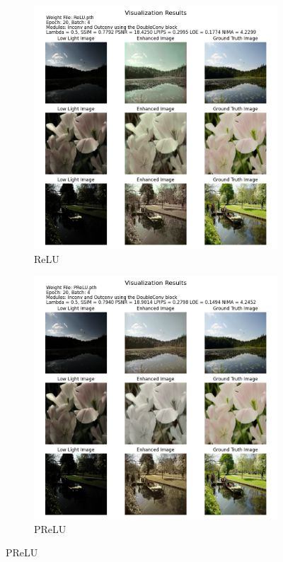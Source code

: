 \documentclass[a4paper]{ctexart}
\begin{document}
	\begin{figure}[htbp]
		\centering
		\begin{subfigure}{0.45\textwidth}
			\includegraphics[width=\linewidth]{picture/LLIE/Experiment/myplot_UNet_ReLU}
			\captionsetup{font=scriptsize}
			\caption{ReLU}
			\label{fig: Baseline_ReLU}	
		\end{subfigure}
		\begin{subfigure}{0.45\textwidth}
			\includegraphics[width=\linewidth]{picture/LLIE/Experiment/myplot_UNet_PReLU}
			\captionsetup{font=scriptsize}
			\caption{PReLU}
			\label{fig: Baseline_PReLU}	
		\end{subfigure}
	\end{figure}
	
\end{document}
